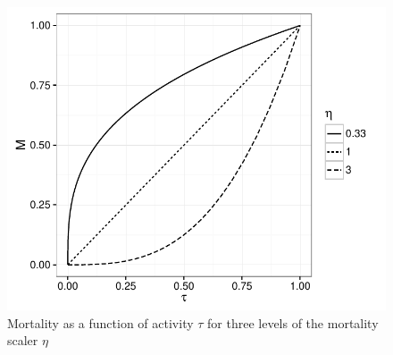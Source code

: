 

\begin{figure}

{\centering \includegraphics[width=\maxwidth,height=0.4\textwidth]{images/mortality-1} 

}

\caption[Mortality as a function of activity $\tau$ for three levels of the mortality scaler $\eta$]{Mortality as a function of activity $\tau$ for three levels of the mortality scaler $\eta$}\label{fig:mortality}
\end{figure}


